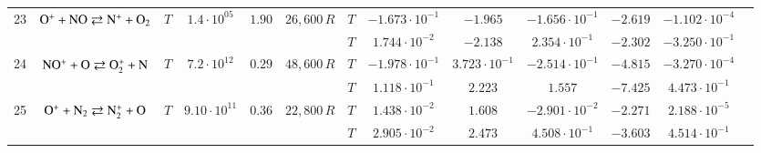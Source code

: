 \documentclass{warpdoc}
\begin{document}
\begin{table}[!ht]
\begin{center}
\begin{threeparttable}
\begin{tabular}{ccccccccccccc}
                                          
23 & $\rm O^+ + NO \rightleftarrows N^+ + O_2$ &$T$ & $1.4 \cdot 10^{05}$ & $1.90$ & $26,600\, R$ 
                                          &$T$  & $-1.673 \cdot 10^{-1}$  & $-1.965$  & $-1.656 \cdot 10^{-1}$ & $-2.619$ & $-1.102 \cdot 10^{-4}$ & \multirow{2}{*}{\cite{book:1990:park,ijhmt:2021:kim}} \\
 & & & & &                                &$T$  & $1.744 \cdot 10^{-2}$  & $-2.138$  & $2.354 \cdot 10^{-1}$ & $-2.302$ & $-3.250 \cdot 10^{-1}$ & ~ \\
 
                                          
24 & $\rm NO^+ + O \rightleftarrows O_2^+ + N$ &$T$ & $7.2 \cdot 10^{12}$ & $0.29$ & $48,600\, R$ 
                                          &$T$  & $-1.978 \cdot 10^{-1}$  & $3.723 \cdot 10^{-1}$  & $-2.514 \cdot 10^{-1}$ & $-4.815$ & $-3.270 \cdot 10^{-4}$ & \multirow{2}{*}{\cite{book:1990:park,ijhmt:2021:kim}} \\
 & & & & &                                &$T$  & $1.118 \cdot 10^{-1}$  & $2.223$  & $1.557$ & $-7.425$ & $4.473 \cdot 10^{-1}$ & ~ \\
 
                                          
25 & $\rm O^+ + N_2 \rightleftarrows N_2^+ + O$ &$T$ & $9.10 \cdot 10^{11}$ & $0.36$ & $22,800\, R$ 
                                          &$T$  & $1.438 \cdot 10^{-2}$  & $1.608$  & $-2.901 \cdot 10^{-2}$ & $-2.271$ & $2.188 \cdot 10^{-5}$ & \multirow{2}{*}{\cite{book:1990:park,ijhmt:2021:kim}} \\
 & & & & &                                &$T$  & $2.905 \cdot 10^{-2}$  & $2.473$  & $4.508 \cdot 10^{-1}$ & $-3.603$ & $4.514 \cdot 10^{-1}$ & ~ \\
 

\end{tabular}
\end{threeparttable}
\end{center}
\end{table}
\end{document}

